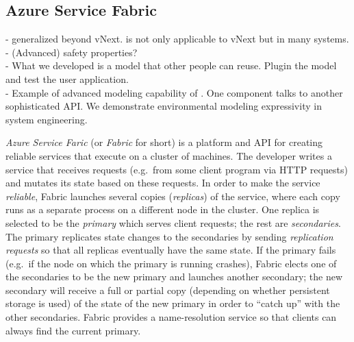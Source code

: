 

\subsection{Azure Service Fabric}
\label{sec:cases:fabric}

- \psharp generalized beyond vNext. \psharp is not only applicable to vNext but in many systems.\\
- (Advanced) safety properties?\\
- What we developed is a model that other people can reuse. Plugin the model and test the user application.\\
- Example of advanced modeling capability of \psharp. One component talks to another sophisticated API. We demonstrate environmental modeling expressivity in system engineering.

\emph{Azure Service Faric} (or \emph{Fabric} for short) is a platform and API for creating reliable services that execute on a cluster of machines. The developer writes a service that receives requests (e.g.\ from some client program via HTTP requests) and mutates its state based on these requests. In order to make the service \emph{reliable}, Fabric launches several copies (\emph{replicas}) of the service, where each copy runs as a separate process on a different node in the cluster. One replica is selected to be the \emph{primary} which serves client requests; the rest are \emph{secondaries}. The primary replicates state changes to the secondaries by sending \emph{replication requests} so that all replicas eventually have the same state. If the primary fails (e.g.\ if the node on which the primary is running crashes), Fabric elects one of the secondaries to be the new primary and launches another secondary; the new secondary will receive a full or partial copy (depending on whether persistent storage is used) of the state of the new primary in order to ``catch up'' with the other secondaries. Fabric provides a name-resolution service so that clients can always find the current primary. 

